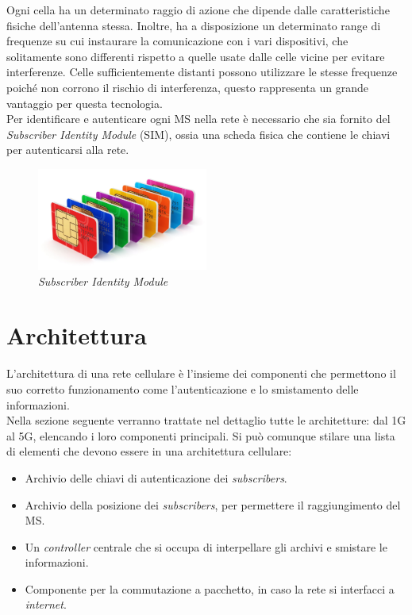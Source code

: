 Ogni cella ha un determinato raggio di azione che dipende dalle caratteristiche fisiche dell'antenna stessa. Inoltre, 
ha a disposizione un determinato range di frequenze su cui instaurare la comunicazione con i vari dispositivi, che solitamente
sono differenti rispetto a quelle usate dalle celle vicine per evitare interferenze.
Celle sufficientemente distanti possono utilizzare le stesse frequenze poiché non corrono il rischio di interferenza, questo rappresenta
un grande vantaggio per questa tecnologia.\\

\noindent Per identificare e autenticare ogni MS nella rete è necessario che sia fornito del \textit{Subscriber Identity Module} (SIM), ossia una scheda fisica 
che contiene le chiavi per autenticarsi alla rete.
\begin{figure}[h]
    \centering
    \includegraphics[width=0.5\textwidth]{images/simcard.jpg}
    \caption{\textit{Subscriber Identity Module}}
\end{figure}

\section{Architettura}
L'architettura di una rete cellulare è l'insieme dei componenti che permettono il suo corretto funzionamento come l'autenticazione e lo smistamento delle informazioni.\\
Nella sezione seguente verranno trattate nel dettaglio tutte le architetture: dal 1G al 5G, elencando i loro componenti principali. Si può comunque stilare una lista di elementi 
che devono essere in una architettura cellulare:
\begin{itemize}
    \item Archivio delle chiavi di autenticazione dei \textit{subscribers}.
    \item Archivio della posizione dei \textit{subscribers}, per permettere il raggiungimento del MS.
    \item Un \textit{controller} centrale che si occupa di interpellare gli archivi e smistare le informazioni.
    \item Componente per la commutazione a pacchetto, in caso la rete si interfacci a \textit{internet}.
\end{itemize}